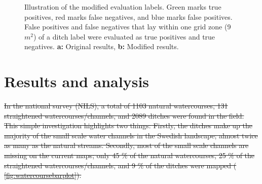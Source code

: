 \documentclass[11pt, review]{elsarticle} %
\providecommand{\DIFdeltex}[1]{{\protect\color{red}\sout{#1}}}                      %
\providecommand{\DIFdelbegin}{} %
\providecommand{\DIFdelend}{} %
\providecommand{\DIFaddendFL}{} %
\providecommand{\DIFdel}[1]{\texorpdfstring{\DIFdeltex{#1}}{}} %
\begin{document}
\begin{figure} [!htb]
    \DIFaddendFL \caption{Illustration of the modified evaluation labels. Green marks true positives, red marks false negatives, and blue marks false positives. False positives and false negatives that lay within one grid zone (9 $m^2$) of a ditch label were evaluated as true positives and true negatives. \textbf{a:} Original results, \textbf{b:} Modified results. }
    \label{fig:newlabels}
\end{figure}

\section{Results and analysis}
\DIFdelbegin \DIFdel{In the national survey (NILS), a total of 1103 natural watercourses, 131 straightened watercourses/channels, and 2089 ditches were found in the field. This simple investigation highlights two things: Firstly, the ditches make up the majority of the small scale water channels in the Swedish landscape; almost twice as many as the natural streams. Secondly, most of the small scale channels are missing on the current maps; only 45 \% of the natural watercourses, 25 \% of the straightened watercourses/channels, and 9 \% of the ditches were mapped (}%
\DIFdel{\ref{fig:watercoursebarplot}).
}\DIFdelend 
\end{document}
